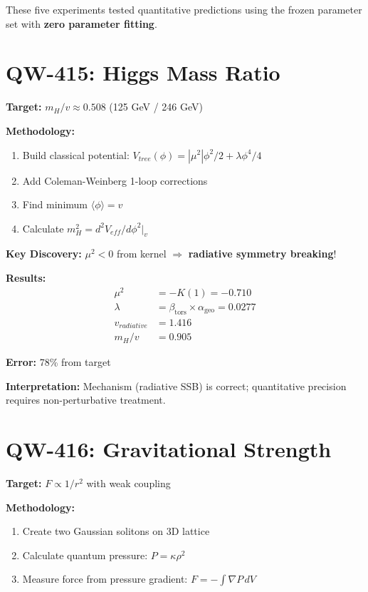 \documentclass[11pt, a4paper]{article}
\theoremstyle{remark}
\newcommand{\alphageo}{\alpha_{\text{geo}}}
\newcommand{\betators}{\beta_{\text{tors}}}
\begin{document}
These five experiments tested quantitative predictions using the frozen parameter set with \textbf{zero parameter fitting}.

\section{QW-415: Higgs Mass Ratio}

\textbf{Target:} $m_H/v \approx 0.508$ (125 GeV / 246 GeV)

\textbf{Methodology:}
\begin{enumerate}
    \item Build classical potential: $V_{tree}(\phi) = |\mu^2|\phi^2/2 + \lambda\phi^4/4$
    \item Add Coleman-Weinberg 1-loop corrections
    \item Find minimum $\langle\phi\rangle = v$
    \item Calculate $m_H^2 = d^2V_{eff}/d\phi^2|_v$
\end{enumerate}

\textbf{Key Discovery:} $\mu^2 < 0$ from kernel $\Rightarrow$ \textbf{radiative symmetry breaking}!

\textbf{Results:}
\begin{align}
\mu^2 &= -K(1) = -0.710 \\
\lambda &= \betators \times \alphageo = 0.0277 \\
v_{radiative} &= 1.416 \\
m_H/v &= \mathbf{0.905}
\end{align}

\textbf{Error:} 78\% from target

\textbf{Interpretation:} Mechanism (radiative SSB) is correct; quantitative precision requires non-perturbative treatment.

\section{QW-416: Gravitational Strength}

\textbf{Target:} $F \propto 1/r^2$ with weak coupling

\textbf{Methodology:}
\begin{enumerate}
    \item Create two Gaussian solitons on 3D lattice
    \item Calculate quantum pressure: $P = \kappa \rho^2$
    \item Measure force from pressure gradient: $F = -\int \nabla P \, dV$
\end{enumerate}
\end{document}
